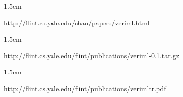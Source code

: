 \documentclass[12pt,twoside]{article}
\begin{document}
\begin{mddefinitions}%


\begin{mdbmarginx}{}{}{}{1.5em}%
\begin{mddefdata}%
\href{http://flint.cs.yale.edu/shao/papers/veriml.html}{{\ttfamily http://\hspace{0pt}flint.\hspace{0pt}cs.\hspace{0pt}yale.\hspace{0pt}edu/\hspace{0pt}shao/\hspace{0pt}papers/\hspace{0pt}veriml.\hspace{0pt}html}}
\end{mddefdata}%
\end{mdbmarginx}%


\begin{mdbmarginx}{}{}{}{1.5em}%
\begin{mddefdata}%
\href{http://flint.cs.yale.edu/flint/publications/veriml-0.1.tar.gz}{{\ttfamily http://\hspace{0pt}flint.\hspace{0pt}cs.\hspace{0pt}yale.\hspace{0pt}edu/\hspace{0pt}flint/\hspace{0pt}publications/\hspace{0pt}veriml-\hspace{0pt}0.\hspace{0pt}1.\hspace{0pt}tar.\hspace{0pt}gz}}
\end{mddefdata}%
\end{mdbmarginx}%


\begin{mdbmarginx}{}{}{}{1.5em}%
\begin{mddefdata}%
\href{http://flint.cs.yale.edu/flint/publications/verimltr.pdf}{{\ttfamily http://\hspace{0pt}flint.\hspace{0pt}cs.\hspace{0pt}yale.\hspace{0pt}edu/\hspace{0pt}flint/\hspace{0pt}publications/\hspace{0pt}verimltr.\hspace{0pt}pdf}}%
\end{mddefdata}%
\end{mdbmarginx}%
\end{mddefinitions}%
\end{document}
